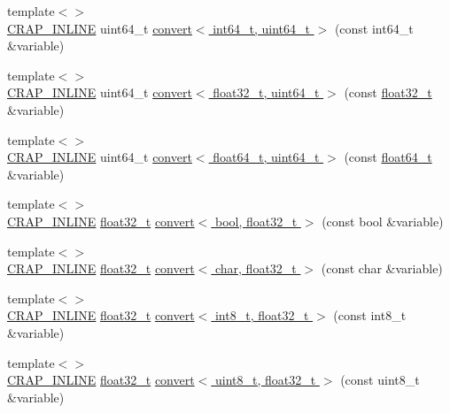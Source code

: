 \begin{DoxyCompactItemize}
\item 
{\footnotesize template$<$$>$ }\\\hyperlink{config__x86_8h_a5a40526b8d842e7ff731509998bb0f1c}{C\+R\+A\+P\+\_\+\+I\+N\+L\+I\+N\+E} uint64\+\_\+t \hyperlink{namespacecrap_a973f7aa1b473575f267478943bb42c23}{convert$<$ int64\+\_\+t, uint64\+\_\+t $>$} (const int64\+\_\+t \&variable)
\item 
{\footnotesize template$<$$>$ }\\\hyperlink{config__x86_8h_a5a40526b8d842e7ff731509998bb0f1c}{C\+R\+A\+P\+\_\+\+I\+N\+L\+I\+N\+E} uint64\+\_\+t \hyperlink{namespacecrap_a9b854f0f9088467eff717004d4e6ff48}{convert$<$ float32\+\_\+t, uint64\+\_\+t $>$} (const \hyperlink{crap__types_8h_a4611b605e45ab401f02cab15c5e38715}{float32\+\_\+t} \&variable)
\item 
{\footnotesize template$<$$>$ }\\\hyperlink{config__x86_8h_a5a40526b8d842e7ff731509998bb0f1c}{C\+R\+A\+P\+\_\+\+I\+N\+L\+I\+N\+E} uint64\+\_\+t \hyperlink{namespacecrap_a718b8ddc03963722aa2a0dabd8eb2f6c}{convert$<$ float64\+\_\+t, uint64\+\_\+t $>$} (const \hyperlink{crap__types_8h_ac55f3ae81b5bc9053760baacf57e47f4}{float64\+\_\+t} \&variable)
\item 
{\footnotesize template$<$$>$ }\\\hyperlink{config__x86_8h_a5a40526b8d842e7ff731509998bb0f1c}{C\+R\+A\+P\+\_\+\+I\+N\+L\+I\+N\+E} \hyperlink{crap__types_8h_a4611b605e45ab401f02cab15c5e38715}{float32\+\_\+t} \hyperlink{namespacecrap_a916efee36ef25d553267832539a327a8}{convert$<$ bool, float32\+\_\+t $>$} (const bool \&variable)
\item 
{\footnotesize template$<$$>$ }\\\hyperlink{config__x86_8h_a5a40526b8d842e7ff731509998bb0f1c}{C\+R\+A\+P\+\_\+\+I\+N\+L\+I\+N\+E} \hyperlink{crap__types_8h_a4611b605e45ab401f02cab15c5e38715}{float32\+\_\+t} \hyperlink{namespacecrap_a4fa4fa9bcd38d2a914e31a1438951eaa}{convert$<$ char, float32\+\_\+t $>$} (const char \&variable)
\item 
{\footnotesize template$<$$>$ }\\\hyperlink{config__x86_8h_a5a40526b8d842e7ff731509998bb0f1c}{C\+R\+A\+P\+\_\+\+I\+N\+L\+I\+N\+E} \hyperlink{crap__types_8h_a4611b605e45ab401f02cab15c5e38715}{float32\+\_\+t} \hyperlink{namespacecrap_ad8802cf6b831b43c9900880903fbb834}{convert$<$ int8\+\_\+t, float32\+\_\+t $>$} (const int8\+\_\+t \&variable)
\item 
{\footnotesize template$<$$>$ }\\\hyperlink{config__x86_8h_a5a40526b8d842e7ff731509998bb0f1c}{C\+R\+A\+P\+\_\+\+I\+N\+L\+I\+N\+E} \hyperlink{crap__types_8h_a4611b605e45ab401f02cab15c5e38715}{float32\+\_\+t} \hyperlink{namespacecrap_ae13e7501216a4865af204060febbdfc5}{convert$<$ uint8\+\_\+t, float32\+\_\+t $>$} (const uint8\+\_\+t \&variable)

\end{DoxyCompactItemize}
